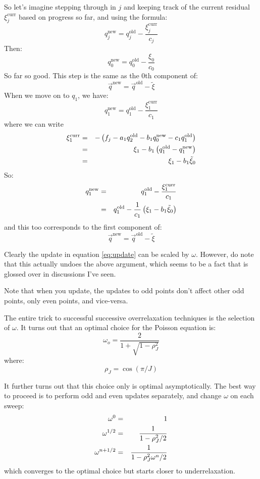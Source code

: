So let's imagine stepping through in $j$ and keeping track of the
current residual $\xi_j^{\mathrm{curr}}$ based on progress so far, and using the
formula:
\begin{equation}
\label{eq:update}
q_j^{\mathrm{new}} = q_j^{\mathrm{old}}
- \frac{\xi_j^{\mathrm{curr}}}{c_j}
\end{equation}
Then:
\begin{equation}
q_0^{\mathrm{new}} = q_0^{\mathrm{old}} - \frac{\xi_0}{c_0}
\end{equation}
So far so good. This step is the same as the 0th component of:
\begin{equation}
\vec{q}^{\mathrm{new}} = \vec{q}^{\mathrm{old}}
- \tilde\xi
\end{equation}
When we move on to $q_1$, we have:
\begin{equation}
q_1^{\mathrm{new}} = q_1^{\mathrm{old}}
- \frac{\xi_1^{\mathrm{curr}}}{c_1}
\end{equation}
where we can write
\begin{eqnarray}
\xi_1^{\mathrm{curr}} &=& - \left(f_j - a_1 q_2^{\mathrm{old}} - b_1
q_0^{\mathrm{new}} - c_1 q_1^{\mathrm{old}}\right) \cr
&=& \xi_1 - b_1 \left(q_1^{\mathrm{old}} -
q_1^{\mathrm{new}}\right) \cr
&=& \xi_1 - b_1 \tilde\xi_0
\end{eqnarray}
So:
\begin{eqnarray}
q_1^{\mathrm{new}} &=& q_1^{\mathrm{old}}
- \frac{\xi_1^{\mathrm{curr}}}{c_1} \cr
&=& q_1^{\mathrm{old}} - \frac{1}{c_1} \left(\xi_1
- b_1 \tilde\xi_0\right)
\end{eqnarray}
and this too corresponds to the first component of: 
\begin{equation}
\vec{q}^{\mathrm{new}} = \vec{q}^{\mathrm{old}}
- \tilde\xi
\end{equation}

Clearly the update in equation \ref{eq:update} can be scaled by
$\omega$. However, do note that this actually undoes the above
argument, which seems to be a fact that is glossed over in discussions
I've seen.

Note that when you update, the updates to odd points don't affect
other odd points, only even points, and vice-versa. 

The entire trick to successful successive overrelaxation techniques is
the selection of $\omega$. It turns out that an optimal choice for the
Poisson equation is:
\begin{equation}
\omega_{o} = \frac{2}{1+\sqrt{1-\rho_J^2}}
\end{equation}
where:
\begin{equation}
\rho_J = \cos(\pi/J)
\end{equation}

It further turns out that this choice only is optimal
asymptotically. The best way to proceed is to perform odd and even
updates separately, and change $\omega$ on each sweep:
\begin{eqnarray}
\omega^{0} &=& 1 \cr
\omega^{1/2} &=& \frac{1}{1-\rho_J^2 /2} \cr
\omega^{n+1/2} &=& \frac{1}{1-\rho_J^2 \omega^n /2} \cr
\end{eqnarray}
which converges to the optimal choice but starts closer to
underrelaxation. 

